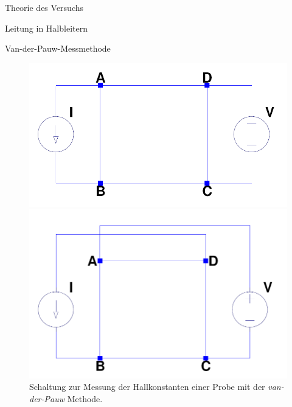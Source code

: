\documentclass[pdftex, a4paper,11pt, twoside, ngerman]{report}
\begin{document}
\begin{chapter}{Theorie des Versuchs}
\begin{section}{Leitung in Halbleitern}
\begin{subsection}{Van-der-Pauw-Messmethode}
            \begin{figure}[ht!]
              \centering
              \begin{minipage}{.48\textwidth}
                \centering
                \includegraphics[width=\textwidth]
                    {Figures/SchaltungPauwWiderstand.png}
                \caption{Schaltung zur Messung des Widerstandes einer Probe
                    mit der \textit{van-der-Pauw} Methode.}
                \label{fig:SchaltungPauwWiderstand}
              \end{minipage}\quad
              \begin{minipage}{.48\textwidth}
                \centering
                \includegraphics[width=\textwidth]
                    {Figures/SchaltungPauwHall.png}
                \caption{Schaltung zur Messung der Hallkonstanten einer Probe
                    mit der \textit{van-der-Pauw} Methode.}
                \label{fig:SchaltungPauwHall}
              \end{minipage}
            \end{figure}
            

\end{subsection}
\end{section}
\end{chapter}
\end{document}
